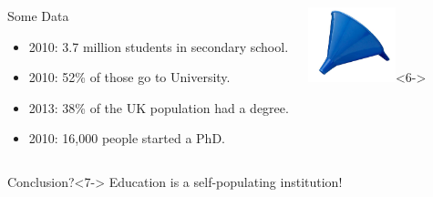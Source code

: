 \documentclass[10pt]{beamer}
\begin{document}
\begin{frame}

\begin{columns}[c]
\begin{block}{Some Data}
\begin{itemize}
\item<2-> 2010: 3.7 million students in secondary school. %
\item<3-> 2010: 52\% of those go to University. %
\item<4-> 2013: 38\% of the UK population had a degree. %
\item<5-> 2010: 16,000 people started a PhD. %
\end{itemize}
\end{block}
\begin{center}
\includegraphics[width=1in]{Funnel.jpg}<6->
\end{center}
\end{columns}

\begin{block}{Conclusion?}<7->
Education is a self-populating institution!
\vspace{1em}
\begin{center}
\end{center}
\vspace{1em}

\end{block}

\end{frame}

\end{document}
